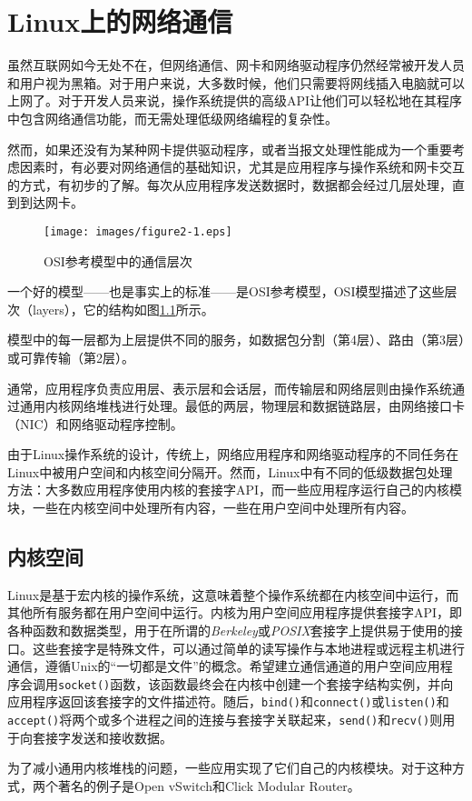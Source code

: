 
\chapter{Linux上的网络通信}

虽然互联网如今无处不在，但网络通信、网卡和网络驱动程序仍然经常被开发人员和用户视为黑箱。对于用户来说，大多数时候，他们只需要将网线插入电脑就可以上网了。对于开发人员来说，操作系统提供的高级API让他们可以轻松地在其程序中包含网络通信功能，而无需处理低级网络编程的复杂性。

然而，如果还没有为某种网卡提供驱动程序，或者当报文处理性能成为一个重要考虑因素时，有必要对网络通信的基础知识，尤其是应用程序与操作系统和网卡交互的方式，有初步的了解。每次从应用程序发送数据时，数据都会经过几层处理，直到到达网卡。

\begin{figure}[htbp]
    \centering
    \texttt{[image: images/figure2-1.eps]}
    \caption{OSI参考模型中的通信层次}\label{fig:OSI-layers} %
\end{figure}

一个好的模型——也是事实上的标准——是OSI参考模型，OSI模型描述了这些层次（layers），它的结构如图\ref{fig:OSI-layers}所示。

模型中的每一层都为上层提供不同的服务，如数据包分割（第4层）、路由（第3层）或可靠传输（第2层）。

通常，应用程序负责应用层、表示层和会话层，而传输层和网络层则由操作系统通过通用内核网络堆栈进行处理。最低的两层，物理层和数据链路层，由网络接口卡（NIC）和网络驱动程序控制。

由于Linux操作系统的设计，传统上，网络应用程序和网络驱动程序的不同任务在Linux中被用户空间和内核空间分隔开。然而，Linux中有不同的低级数据包处理方法：大多数应用程序使用内核的套接字API，而一些应用程序运行自己的内核模块，一些在内核空间中处理所有内容，一些在用户空间中处理所有内容。

\section{内核空间}

Linux是基于宏内核的操作系统，这意味着整个操作系统都在内核空间中运行，而其他所有服务都在用户空间中运行。内核为用户空间应用程序提供套接字API，即各种函数和数据类型，用于在所谓的\textit{Berkeley}或\textit{POSIX}套接字上提供易于使用的接口。这些套接字是特殊文件，可以通过简单的读写操作与本地进程或远程主机进行通信，遵循Unix的“一切都是文件”的概念。希望建立通信通道的用户空间应用程序会调用\verb|socket()|函数，该函数最终会在内核中创建一个套接字结构实例，并向应用程序返回该套接字的文件描述符。随后，\verb|bind()|和\verb|connect()|或\verb|listen()|和\verb|accept()|将两个或多个进程之间的连接与套接字关联起来，\verb|send()|和\verb|recv()|则用于向套接字发送和接收数据。

为了减小通用内核堆栈的问题，一些应用实现了它们自己的内核模块。对于这种方式，两个著名的例子是Open vSwitch\cite{pfaff2015design}和Click Modular Router\cite{kohler2000click}。

